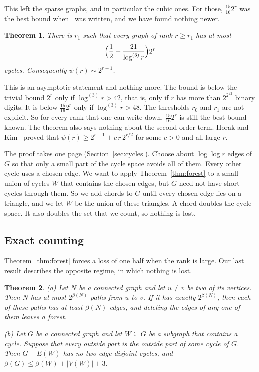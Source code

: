 \documentclass[11pt]{article}
\newtheorem{theorem}{Theorem}[section]
\theoremstyle{definition}
\theoremstyle{remark}
\newcommand{\lgk}[1]{\log^{(#1)}}
\numberwithin{equation}{section}
\begin{document}
This left the sparse graphs, and in particular the cubic ones. For those, $\frac{15}{16}2^{r}$ was
the best bound when~\cite{HK} was written, and we have found nothing newer.

\begin{theorem}\label{thm:cycles}
There is $r_1$ such that every graph of rank $r\ge r_1$ has at most
\[
  \Bigl(\frac12+\frac{21}{\lgk{3}r}\Bigr)2^{r}
\]
cycles. Consequently $\psi(r)\sim2^{r-1}$.
\end{theorem}

This is an asymptotic statement and nothing more. The bound is below the trivial bound $2^{r}$ only
if $\lgk3r>42$, that is, only if $r$ has more than $2^{2^{42}}$ binary digits. It is below
$\frac{15}{16}2^{r}$ only if
$\lgk3r>48$. The thresholds $r_0$ and $r_1$ are not explicit. So for every rank that one can write
down, $\frac{15}{16}2^{r}$ is still the best bound known. The theorem also says nothing about the
second-order term. Horak and Kim~\cite{HK} proved that $\psi(r)\ge2^{r-1}+c\,r\,2^{r/2}$ for some
$c>0$ and all large $r$.

The proof takes one page (Section~\ref{sec:cycles}). Choose about $\log\log r$ edges of $G$ so that
only a small part of the cycle space avoids all of them. Every other cycle uses a chosen edge. We
want to apply Theorem~\ref{thm:forest} to a small union of cycles $W$ that contains the chosen
edges, but $G$ need not have short cycles through them. So we add chords to $G$ until every chosen
edge lies on a triangle, and we let $W$ be the union of these triangles. A chord doubles the cycle
space. It also doubles the set that we count, so nothing is lost.

\subsection{Exact counting}

Theorem~\ref{thm:forest} forces a loss of one half when the rank is large. Our last result describes
the opposite regime, in which nothing is lost.

\begin{theorem}\label{thm:exact}
\textup{(a)} Let $N$ be a connected graph and let $u\ne v$ be two of its vertices. Then $N$ has at
most $2^{\beta(N)}$ paths from $u$ to $v$. If it has exactly $2^{\beta(N)}$, then each of these paths
has at least $\beta(N)$ edges, and deleting the edges of any one of them leaves a forest.

\textup{(b)} Let $G$ be a connected graph and let $W\subseteq G$ be a subgraph that contains a cycle.
Suppose that every outside part is the outside part of some cycle of $G$. Then $G-E(W)$ has no two
edge-disjoint cycles, and $\beta(G)\le\beta(W)+|V(W)|+3$.
\end{theorem}
\end{document}

